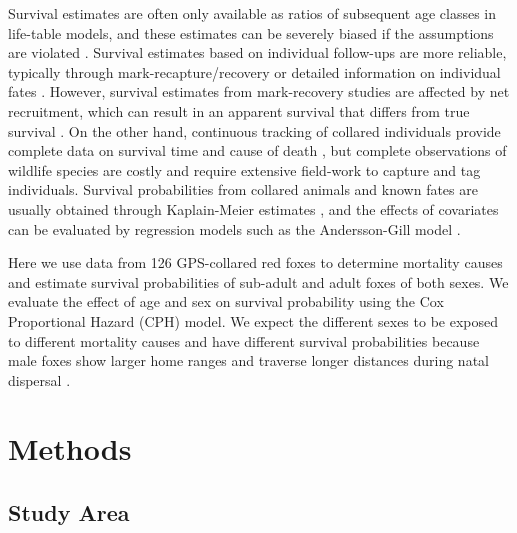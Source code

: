 Survival estimates are often only available as ratios of subsequent age classes in life-table models, and these estimates can be severely biased if the assumptions are violated \citep{andersonProblemsEstimatingAgeSpecific1985}. Survival estimates based on individual follow-ups are more reliable, typically through mark-recapture/recovery or detailed information on individual fates \citep{lebretonStatisticalAnalysisSurvival1993}. However, survival estimates from mark-recovery studies are affected by net recruitment, which can result in an apparent survival that differs from true survival \citep{schaubEstimatingTrueInstead2014}. On the other hand, continuous tracking of collared individuals provide complete data on survival time and cause of death \citep{white2012analysis}, but complete observations of wildlife species are costly and require extensive field-work to capture and tag individuals. Survival probabilities from collared animals and known fates are usually obtained through Kaplain-Meier estimates \citep{pollockSurvivalAnalysisTelemetry1989}, and the effects of covariates can be evaluated by regression models such as the Andersson-Gill model \citep{andersenCoxsRegressionModel1982, murrayWildlifeSurvivalEstimation2006}. 

Here we use data from 126 GPS-collared red foxes to determine mortality causes and estimate survival probabilities of sub-adult and adult foxes of both sexes. We evaluate the effect of age and sex on survival probability using the Cox Proportional Hazard (CPH) model. We expect the different sexes to be exposed to different mortality causes and have different survival probabilities because male foxes show larger home ranges \citep{waltonVariationHomeRange2017} and traverse longer distances during natal dispersal \citep{englundPopulationDynamicsRed1980}. 


\section*{Methods}

\subsection*{Study Area}

